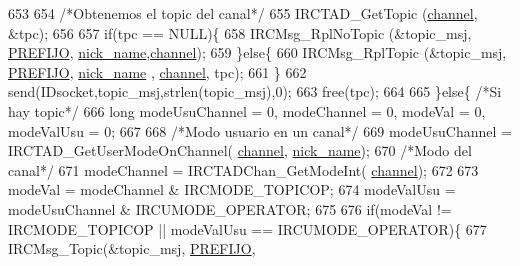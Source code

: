 \begin{DoxyCode}
{{{{{{{{{{653 
654                                         \textcolor{comment}{/*Obtenemos el topic del canal*/}
655                                         IRCTAD\_GetTopic (\hyperlink{_g-2361-06-_p1-_server_8c_a842ca2f026578e5c479c095ff3335969}{channel}, &tpc);
656 
657                                         \textcolor{keywordflow}{if}(tpc == NULL)\{
658                                                 IRCMsg\_RplNoTopic (&topic\_msj, 
      \hyperlink{_g-2361-06-_p1-_server_8h_a78c658ff923693099f7b621e7c351129}{PREFIJO}, \hyperlink{_g-2361-06-_p1-_server_8c_aabbf66718cda228b924a4a9441eadf62}{nick\_name},\hyperlink{_g-2361-06-_p1-_server_8c_a842ca2f026578e5c479c095ff3335969}{channel});
659                                         \}\textcolor{keywordflow}{else}\{
660                                                 IRCMsg\_RplTopic (&topic\_msj, 
      \hyperlink{_g-2361-06-_p1-_server_8h_a78c658ff923693099f7b621e7c351129}{PREFIJO}, \hyperlink{_g-2361-06-_p1-_server_8c_aabbf66718cda228b924a4a9441eadf62}{nick\_name} , \hyperlink{_g-2361-06-_p1-_server_8c_a842ca2f026578e5c479c095ff3335969}{channel}, tpc);
661                                         \}
662                                         send(IDsocket,topic\_msj,strlen(topic\_msj),0);
663                                         free(tpc); 
664 
665                                 \}\textcolor{keywordflow}{else}\{ \textcolor{comment}{/*Si hay topic*/}
666                                         \textcolor{keywordtype}{long} modeUsuChannel = 0, modeChannel = 0, modeVal = 0, modeValUsu =
       0;
667                                         
668                                         \textcolor{comment}{/*Modo usuario en un canal*/}
669                                         modeUsuChannel = IRCTAD\_GetUserModeOnChannel(
      \hyperlink{_g-2361-06-_p1-_server_8c_a842ca2f026578e5c479c095ff3335969}{channel}, \hyperlink{_g-2361-06-_p1-_server_8c_aabbf66718cda228b924a4a9441eadf62}{nick\_name});
670                                         \textcolor{comment}{/*Modo del canal*/}
671                                         modeChannel = IRCTADChan\_GetModeInt(
      \hyperlink{_g-2361-06-_p1-_server_8c_a842ca2f026578e5c479c095ff3335969}{channel});
672 
673                                         modeVal = modeChannel & IRCMODE\_TOPICOP;
674                                         modeValUsu = modeUsuChannel & IRCUMODE\_OPERATOR;
675 
676                                         \textcolor{keywordflow}{if}(modeVal != IRCMODE\_TOPICOP || modeValUsu == IRCUMODE\_OPERATOR)\{
677                                                 IRCMsg\_Topic(&topic\_msj, \hyperlink{_g-2361-06-_p1-_server_8h_a78c658ff923693099f7b621e7c351129}{PREFIJO}, 
}}}}}}}}}}
\end{DoxyCode}
